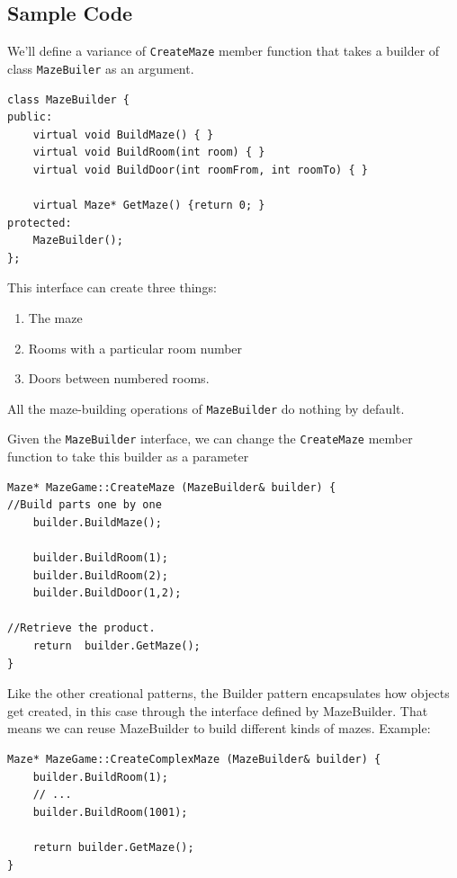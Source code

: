 \documentclass[11pt, a4paper]{book}
\begin{document}
\subsection{Sample Code}
We'll define a variance of \verb|CreateMaze| member function that takes a
builder of class \verb|MazeBuiler| as an argument. 
\begin{verbatim}
class MazeBuilder {
public:
    virtual void BuildMaze() { }
    virtual void BuildRoom(int room) { }
    virtual void BuildDoor(int roomFrom, int roomTo) { }

    virtual Maze* GetMaze() {return 0; }
protected:
    MazeBuilder();
};
\end{verbatim}
This interface can create three things: 
\begin{enumerate}
\item The maze
\item Rooms with a particular room number
\item Doors between numbered rooms.
\end{enumerate}

All the maze-building operations of \verb|MazeBuilder| do nothing by default.

Given the \verb|MazeBuilder| interface, we can change the \verb|CreateMaze|
member function to take this builder as a parameter

\begin{verbatim}
Maze* MazeGame::CreateMaze (MazeBuilder& builder) {
//Build parts one by one
    builder.BuildMaze();

    builder.BuildRoom(1);
    builder.BuildRoom(2);
    builder.BuildDoor(1,2);

//Retrieve the product.
    return  builder.GetMaze();
}
\end{verbatim}

Like the other creational patterns, the Builder pattern encapsulates how objects
get created, in this case through the interface defined by MazeBuilder. That
means we can reuse MazeBuilder to build different kinds of mazes. Example:
\begin{verbatim}
Maze* MazeGame::CreateComplexMaze (MazeBuilder& builder) {
    builder.BuildRoom(1);
    // ...
    builder.BuildRoom(1001);

    return builder.GetMaze();
}
\end{verbatim}
\end{document}
